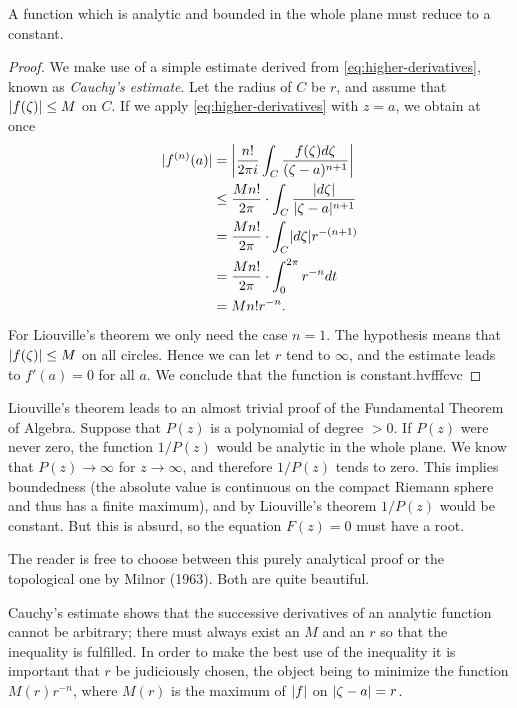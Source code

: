 \begin{theorem}[Liouville]
A function which is analytic and bounded in the whole plane must reduce to a constant.
\end{theorem}
\begin{proof}
We make use of a simple estimate derived from \ref{eq:higher-derivatives}, known as \emph{Cauchy's estimate}. Let the radius of $C$ be $r$, and assume that $\lvert f(\zeta) \rvert \le M$ on $C$. If we apply \ref{eq:higher-derivatives} with $z=a$, we obtain at once
\begin{align*}
\lvert f^{(n)}(a) \rvert &= \left\lvert \dfrac{n!}{2\pi i}\int_{C} \dfrac{f(\zeta)d\zeta}{(\zeta-a)^{n+1}}\right \rvert \\
&\le \dfrac{M n!}{2\pi} \cdot \int_{C}\dfrac{\lvert d\zeta \rvert}{\lvert \zeta-a \rvert^{n+1}} \\
&=\dfrac{M n!}{2\pi} \cdot \int_{C}\lvert d\zeta \rvert r^{-(n+1)} \\
&=\dfrac{M n!}{2\pi} \cdot \int_{0}^{2\pi}r^{-n}dt \\
&=Mn!r^{-n}.
\end{align*}
For Liouville's theorem we only need the case $n=1$. The hypothesis means that $\lvert f(\zeta) \rvert \le M$ on all circles. Hence we can let $r$ tend to $\infty$, and the estimate leads to $f'(a)=0$ for all $a$. We conclude that the function is constant.hvfffcvc
\end{proof}
Liouville's theorem leads to an almost trivial proof of the Fundamental Theorem of Algebra. Suppose that $P(z)$ is a polynomial of degree $>0$. If $P(z)$ were never zero, the function $1/P(z)$ would be analytic in the whole plane. We know that $P(z) \rightarrow \infty$ for $z \rightarrow \infty$, and therefore $1/P(z)$ tends to zero. This implies boundedness (the absolute value is continuous on the compact Riemann sphere and thus has a finite maximum), and by Liouville's theorem $1/P(z)$ would be constant. But this is absurd, so the equation $F(z)=0$ must have a root.

The reader is free to choose between this purely analytical proof or the topological one by Milnor (1963). Both are quite beautiful.

Cauchy's estimate shows that the successive derivatives of an analytic function cannot be arbitrary; there must always exist an $M$ and an $r$ so that the inequality is fulfilled. In order to make the best use of the inequality it is important that $r$ be judiciously chosen, the object being to minimize the function $M(r)r^{-n}$, where $M(r)$ is the maximum of $\lvert f \rvert$ on $\lvert \zeta-a \rvert=r$.

